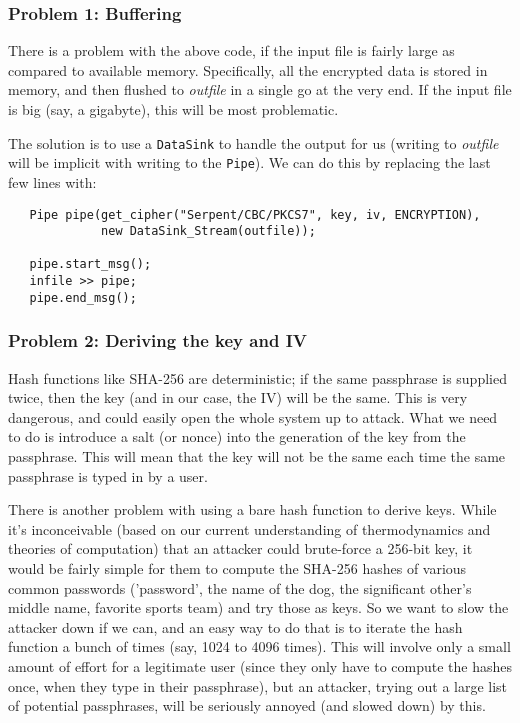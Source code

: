 \documentclass{article}
\newcommand{\type}[1]{\texttt{#1}}
\renewcommand{\arg}[1]{\textsl{#1}}
\newcommand{\variable}[1]{\textsl{#1}}
\begin{document}
\subsubsection{Problem 1: Buffering}

There is a problem with the above code, if the input file is fairly large as
compared to available memory. Specifically, all the encrypted data is stored
in memory, and then flushed to \variable{outfile} in a single go at the very
end. If the input file is big (say, a gigabyte), this will be most problematic.

The solution is to use a \type{DataSink} to handle the output for us (writing
to \arg{outfile} will be implicit with writing to the \type{Pipe}). We can do
this by replacing the last few lines with:

\begin{verbatim}
   Pipe pipe(get_cipher("Serpent/CBC/PKCS7", key, iv, ENCRYPTION),
             new DataSink_Stream(outfile));

   pipe.start_msg();
   infile >> pipe;
   pipe.end_msg();
\end{verbatim}

\subsubsection{Problem 2: Deriving the key and IV}

Hash functions like SHA-256 are deterministic; if the same passphrase
is supplied twice, then the key (and in our case, the IV) will be the
same. This is very dangerous, and could easily open the whole system
up to attack. What we need to do is introduce a salt (or nonce) into
the generation of the key from the passphrase. This will mean that the
key will not be the same each time the same passphrase is typed in by
a user.

There is another problem with using a bare hash function to derive
keys. While it's inconceivable (based on our current understanding of
thermodynamics and theories of computation) that an attacker could
brute-force a 256-bit key, it would be fairly simple for them to
compute the SHA-256 hashes of various common passwords ('password',
the name of the dog, the significant other's middle name, favorite
sports team) and try those as keys. So we want to slow the attacker
down if we can, and an easy way to do that is to iterate the hash
function a bunch of times (say, 1024 to 4096 times). This will involve
only a small amount of effort for a legitimate user (since they only
have to compute the hashes once, when they type in their passphrase),
but an attacker, trying out a large list of potential passphrases,
will be seriously annoyed (and slowed down) by this.
\end{document}
